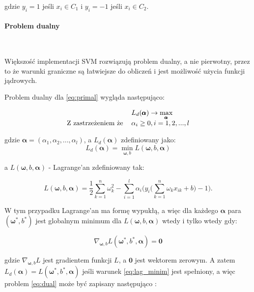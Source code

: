 \documentclass[paper=a4, fontsize=11pt]{scrartcl} %
\numberwithin{equation}{section} %
\numberwithin{figure}{section} %
\newcommand{\myparagraph}[1]{\paragraph{#1}\mbox{}\\}
\begin{document}
    gdzie $y_i=1$ jeśli $x_i \in C_1$ i $y_i=-1$ jeśli $x_i \in C_2$.
\myparagraph{Problem dualny}
    \par Większość implementacji SVM rozwiązują problem dualny, a nie pierwotny, przez to że
    warunki graniczne są łatwiejsze do obliczeń i jest możliwość użycia funkcji jądrowych.

    \par Problem dualny dla \ref{eq:primal} wygląda następująco:

    \begin{equation} \label{eq:dual}
        \begin{tabular}{rl}
            & $L_d(\pmb{\alpha}) \rightarrow \max\limits_{\pmb{\alpha}}$ \\
            Z zastrzeżeniem że & $\alpha_i \geq 0,i=1,2,...,l$
        \end{tabular}
    \end{equation}

    gdzie $\pmb{\alpha} = (\alpha_1,\alpha_2,...,\alpha_l)$, a $L_d(\pmb{\alpha})$ zdefiniowany jako:
    \begin{equation}
        L_d(\pmb{\alpha}) = \min\limits_{\pmb{\omega},b}L(\pmb{\omega},b,\pmb{\alpha})
    \end{equation}

    a $L(\pmb{\omega},b,\pmb{\alpha})$ - Lagrange'an zdefiniowany tak: 

    \begin{equation} \label{eq:lagrange}
        L(\pmb{\omega},b,\pmb{\alpha}) = \frac{1}{2}\sum\limits_{k=1}^{n}\omega_{k}^2 -
        \sum\limits_{i=1}^{l} \alpha_i \Bigg(y_i \Bigg( \sum\limits_{k=1}^{n} \omega_k x_{ik}
        +b \Bigg) -1 \Bigg).
    \end{equation}

    \par W tym przypadku Lagrange'an ma formę wypukłą, a więc dla każdego $\pmb{\alpha}$ para
    $(\pmb{\omega^*},b^*)$ jest globalnym minimum dla $L(\pmb{\omega},b,\pmb{\alpha})$ wtedy i
    tylko wtedy gdy:

    \begin{equation} \label{eq:lag_minim}
        \nabla_{\pmb{\omega},b} L(\pmb{\omega}^*,b^*,\pmb{\alpha}) = \pmb{0}
    \end{equation}

    gdzie $\nabla_{\pmb{\omega},b} L$ jest gradientem funkcji $L$, a $\pmb{0}$ jest wektorem
    zerowym. A zatem $L_d(\pmb{\alpha}) = L(\pmb{\omega}^*,b^*,\pmb{\alpha})$ jeśli warunek
    \ref{eq:lag_minim} jest spełniony, a więc problem \ref{eq:dual} może być zapisany następująco
    \cite{nefedov2016support}:
\end{document}
